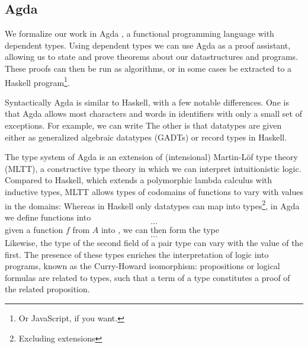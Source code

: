 \subsection{Agda}
We formalize our work in Agda \cite{agda}, a functional programming language with dependent types. Using dependent types we can use Agda as a proof assistant, allowing us to state and prove theorems about our datastructures and programs.  These proofs can then be run as algorithms, or in some cases be extracted to a Haskell program\footnote{Or JavaScript, if you want.}.

Syntactically Agda is similar to Haskell, with a few notable differences. One is that Agda allows most characters and words in identifiers with only a small set of exceptions. For example, we can write
The other is that datatypes are given either as generalized algebraic datatypes (GADTs) or record types in Haskell.

The type system of Agda is an extension of (intensional) Martin-Löf type theory (MLTT), a constructive type theory in which we can interpret intuitionistic logic. Compared to Haskell, which extends a polymorphic lambda calculus with inductive types, MLTT allows types of codomains of functions to vary with values in the domains: Whereas in Haskell only datatypes can map into types\footnote{Excluding extensions}, in Agda we define functions into 
\[ \dots \]
given a function $f$ from $A$ into , we can then form the type
\[ \dots \]
Likewise, the type of the second field of a pair type can vary with the value of the first. The presence of these types enriches the interpretation of logic into programs, known as the Curry-Howard isomorphism: propositions or logical formulas are related to types, such that a term of a type constitutes a proof of the related proposition.

